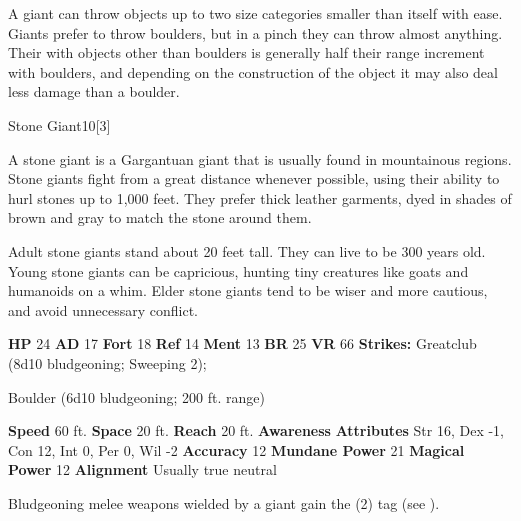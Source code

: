         A giant can throw objects up to two size categories smaller than itself with ease.
        Giants prefer to throw boulders, but in a pinch they can throw almost anything.
        Their  with objects other than boulders is generally half their range increment with boulders, and depending on the construction of the object it may also deal less damage than a boulder.
  

  \begin{monsubsection}{Stone Giant}{10}[3]
    \vspace{-1em}\vspace{-1em}
    \vspace{0em}

    
          A stone giant is a Gargantuan giant that is usually found in mountainous regions.
          Stone giants fight from a great distance whenever possible, using their ability to hurl stones up to 1,000 feet.
          They prefer thick leather garments, dyed in shades of brown and gray to match the stone around them.
        
          Adult stone giants stand about 20 feet tall.
          They can live to be 300 years old.
          Young stone giants can be capricious, hunting tiny creatures like goats and humanoids on a whim.
          Elder stone giants tend to be wiser and more cautious, and avoid unnecessary conflict.
        

    \begin{spellcontent}
      \begin{spelltargetinginfo}
        \pari \textbf{HP} 24 \monsep
          \textbf{AD} 17 \monsep
          \textbf{Fort} 18 \monsep
          \textbf{Ref} 14 \monsep
          \textbf{Ment} 13
        \pari \textbf{BR} 25 \monsep
        \textbf{VR} 66
        \pari \textbf{Strikes:}
            Greatclub  (8d10 bludgeoning; Sweeping 2);
\par Boulder  (6d10 bludgeoning; 200 ft. range)
      \end{spelltargetinginfo}
    \end{spellcontent}
    \begin{monsterfooter}
      \pari \textbf{Speed} 60 ft. \monsep
        \textbf{Space} 20 ft. \monsep
        \textbf{Reach} 20 ft.
      \pari \textbf{Awareness} 
      \pari \textbf{Attributes}
        Str 16, Dex -1,
        Con 12, Int 0,
        Per 0, Wil -2
      \pari \textbf{Accuracy} 12 \monsep
        \textbf{Mundane Power} 21 \monsep
      \textbf{Magical Power} 12
      \pari \textbf{Alignment} Usually true neutral
    \end{monsterfooter}
  \end{monsubsection}
        Bludgeoning melee weapons wielded by a giant gain the  (2) tag (see ).
      
